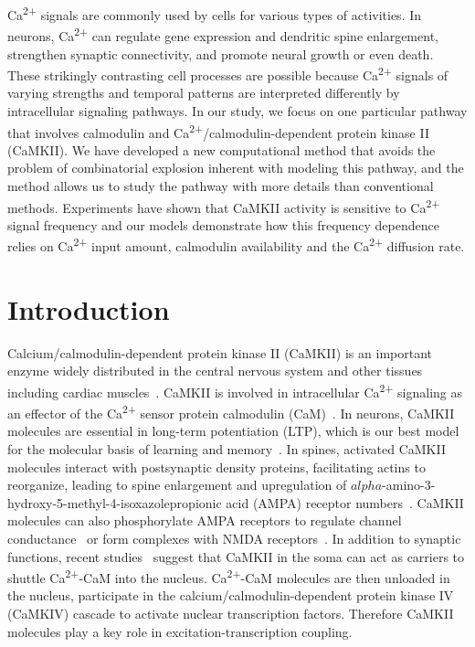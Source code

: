 \documentclass[10pt,letterpaper]{article}
\begin{document}
Ca\textsuperscript{2+} signals are commonly used by cells for various types of activities. In neurons, Ca\textsuperscript{2+} can regulate gene expression and dendritic spine enlargement, strengthen synaptic connectivity, and promote neural growth or even death. These strikingly contrasting cell processes are possible because Ca\textsuperscript{2+} signals of varying strengths and temporal patterns are interpreted differently by intracellular signaling pathways. In our study, we focus on one particular pathway that involves calmodulin and Ca\textsuperscript{2+}/calmodulin-dependent protein kinase II (CaMKII). We have developed a new computational method that avoids the problem of combinatorial explosion inherent with modeling this pathway, and the method allows us to study the pathway with more details than conventional methods. Experiments have shown that CaMKII activity is sensitive to Ca\textsuperscript{2+} signal frequency and our models demonstrate how this frequency dependence relies on Ca\textsuperscript{2+} input amount, calmodulin availability and the Ca\textsuperscript{2+} diffusion rate.

\linenumbers
\section*{Introduction}
Calcium/calmodulin-dependent protein kinase II (CaMKII) is an important enzyme widely distributed in the central nervous system and other tissues including cardiac muscles~\cite{Wayman:2008gla,Lisman:2002ki,Erickson:2014fs}. CaMKII is involved in intracellular Ca\textsuperscript{2+} signaling as an effector of the Ca\textsuperscript{2+} sensor protein calmodulin (CaM)~\cite{Herring:2016bh,Hell:2014bd,Coultrap:2012ip}. In neurons, CaMKII molecules are essential in long-term potentiation (LTP), which is our best model for the molecular basis of learning and memory~\cite{Bliss:1973jg}. In spines, activated CaMKII molecules interact with postsynaptic density proteins, facilitating actins to reorganize, leading to spine enlargement and upregulation of $alpha$-amino-3-hydroxy-5-methyl-4-isoxazolepropionic acid (AMPA) receptor numbers~\cite{Herring:2016bh}. CaMKII molecules can also phosphorylate AMPA receptors to regulate channel conductance~\cite{Herring:2016bh,Coultrap:2012ip} or form complexes with NMDA receptors~\cite{Hell:2014bd}. In addition to synaptic functions, recent studies~\cite{Ma:2014dr,Li:2016cq} suggest that CaMKII in the soma can act as carriers to shuttle Ca\textsuperscript{2+}-CaM into the nucleus. Ca\textsuperscript{2+}-CaM molecules are then unloaded in the nucleus, participate in the calcium/calmodulin-dependent protein kinase IV (CaMKIV) cascade to activate nuclear transcription factors. Therefore CaMKII molecules play a key role in excitation-transcription coupling. 
\end{document}
